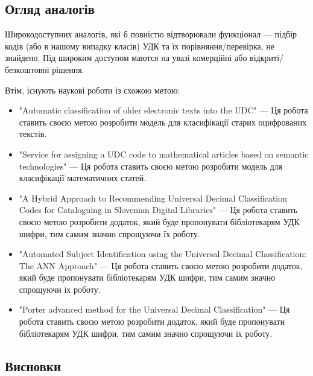 \documentclass[14pt]{extarticle}
\begin{document}
  \subsection{Огляд аналогів}
  Широкодоступних аналогів, які б повністю відтворювали функціонал ---
  підбір кодів (або в нашому випадку класів) УДК та їх порівняння/перевірка,
  не знайдено. Під широким доступом маются на увазі комерційні
  або відкриті/безкоштовні рішення.

  Втім, існують наукові роботи із схожою метою:
  \begin{itemize}[labelindent=\dimexpr{}\relax, leftmargin=*]
    \item "Automatic classification of older electronic texts into the UDC"
      \cite{kragelj_automatic_udc_classification}
      --- Ця робота ставить своєю метою розробити модель для
      класифікації старих оцифрованих текстів.
    
    \item "Service for assigning a UDC code
	    to mathematical articles based on semantic technologies"
      \cite{almukhametov_udc_code_for_math_articles} --- 
      Ця робота ставить своєю метою розробити модель
      для класифікації математичних статей.
    
    \item "A Hybrid Approach to Recommending
      Universal Decimal Classification Codes
      for Cataloguing in Slovenian Digital Libraries"
      \cite{borovic_hybrid_udc_recommendation} ---
      Ця робота ставить своєю метою розробити додаток,
      який буде пропонувати бібліотекарям УДК шифри,
      тим самим значно спрощуючи їх роботу.

    \item "Automated Subject Identification using the
      Universal Decimal Classification: The ANN Approach"
      \cite{roy_ann_approach} ---
      Ця робота ставить своєю метою розробити додаток,
      який буде пропонувати бібліотекарям УДК шифри,
      тим самим значно спрощуючи їх роботу.

    \item "Porter advanced method for the Universal Decimal Classification"
      \cite{tretyakov_porter} --- 
      Ця робота ставить своєю метою розробити додаток,
      який буде пропонувати бібліотекарям УДК шифри,
      тим самим значно спрощуючи їх роботу.

  \end{itemize}

  \subsection{Висновки}
\end{document}
